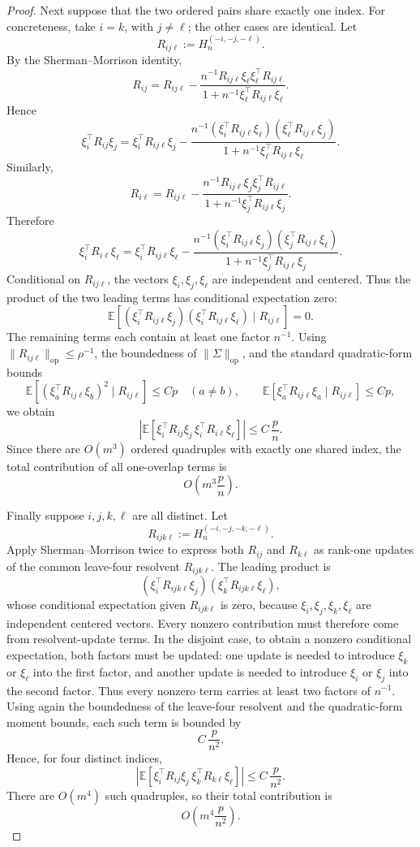 \documentclass{article}
\theoremstyle{plain}
\theoremstyle{remark}
\def \E{\mathbb{E}}
\newcommand{\op}{\mathrm{op}}
\begin{document}
\begin{proof}
Next suppose that the two ordered pairs share exactly one index.  For concreteness, take
\(i=k\), with \(j\ne \ell\); the other cases are identical.  Let
\[
R_{ij\ell}:=H_n^{(-i,-j,-\ell)}.
\]
By the Sherman--Morrison identity,
\[
R_{ij}
=
R_{ij\ell}
-
\frac{n^{-1}R_{ij\ell}\xi_\ell\xi_\ell^\top R_{ij\ell}}
{1+n^{-1}\xi_\ell^\top R_{ij\ell}\xi_\ell}.
\]
Hence
\[
\xi_i^\top R_{ij}\xi_j
=
\xi_i^\top R_{ij\ell}\xi_j
-
\frac{
n^{-1}(\xi_i^\top R_{ij\ell}\xi_\ell)
(\xi_\ell^\top R_{ij\ell}\xi_j)
}{
1+n^{-1}\xi_\ell^\top R_{ij\ell}\xi_\ell
}.
\]
Similarly,
\[
R_{i\ell}
=
R_{ij\ell}
-
\frac{n^{-1}R_{ij\ell}\xi_j\xi_j^\top R_{ij\ell}}
{1+n^{-1}\xi_j^\top R_{ij\ell}\xi_j}.
\]
Therefore
\[
\xi_i^\top R_{i\ell}\xi_\ell
=
\xi_i^\top R_{ij\ell}\xi_\ell
-
\frac{
n^{-1}(\xi_i^\top R_{ij\ell}\xi_j)
(\xi_j^\top R_{ij\ell}\xi_\ell)
}{
1+n^{-1}\xi_j^\top R_{ij\ell}\xi_j
}.
\]
Conditional on \(R_{ij\ell}\), the vectors \(\xi_i,\xi_j,\xi_\ell\) are independent and centered.
Thus the product of the two leading terms has conditional expectation zero:
\[
\E\left[
(\xi_i^\top R_{ij\ell}\xi_j)
(\xi_i^\top R_{ij\ell}\xi_\ell)
\mid R_{ij\ell}
\right]=0.
\]
The remaining terms each contain at least one factor \(n^{-1}\).  Using
\(\|R_{ij\ell}\|_{\op}\le \rho^{-1}\), the boundedness of \(\|\Sigma\|_{\op}\), and the standard
quadratic-form bounds
\[
\E\left[(\xi_a^\top R_{ij\ell}\xi_b)^2\mid R_{ij\ell}\right]\le Cp
\quad(a\ne b),
\qquad
\E\left[\xi_a^\top R_{ij\ell}\xi_a\mid R_{ij\ell}\right]\le Cp,
\]
we obtain
\[
\left|
\E\left[
\xi_i^\top R_{ij}\xi_j\,
\xi_i^\top R_{i\ell}\xi_\ell
\right]
\right|
\le C\,\frac{p}{n}.
\]
Since there are \(O(m^3)\) ordered quadruples with exactly one shared index, the total contribution
of all one-overlap terms is
\[
O\left(m^3\frac{p}{n}\right).
\]

Finally suppose \(i,j,k,\ell\) are all distinct.  Let
\[
R_{ijk\ell}:=H_n^{(-i,-j,-k,-\ell)}.
\]
Apply Sherman--Morrison twice to express both \(R_{ij}\) and \(R_{k\ell}\) as rank-one updates of
the common leave-four resolvent \(R_{ijk\ell}\).  The leading product is
\[
(\xi_i^\top R_{ijk\ell}\xi_j)(\xi_k^\top R_{ijk\ell}\xi_\ell),
\]
whose conditional expectation given \(R_{ijk\ell}\) is zero, because
\(\xi_i,\xi_j,\xi_k,\xi_\ell\) are independent centered vectors.  Every nonzero contribution must
therefore come from resolvent-update terms.  In the disjoint case, to obtain a nonzero conditional
expectation, both factors must be updated: one update is needed to introduce \(\xi_k\) or \(\xi_\ell\)
into the first factor, and another update is needed to introduce \(\xi_i\) or \(\xi_j\) into the second
factor.  Thus every nonzero term carries at least two factors of \(n^{-1}\).  Using again the
boundedness of the leave-four resolvent and the quadratic-form moment bounds, each such term is
bounded by
\[
C\,\frac{p}{n^2}.
\]
Hence, for four distinct indices,
\[
\left|
\E\left[
\xi_i^\top R_{ij}\xi_j\,
\xi_k^\top R_{k\ell}\xi_\ell
\right]
\right|
\le C\,\frac{p}{n^2}.
\]
There are \(O(m^4)\) such quadruples, so their total contribution is
\[
O\left(m^4\frac{p}{n^2}\right).
\]


\end{proof}
\end{document}
